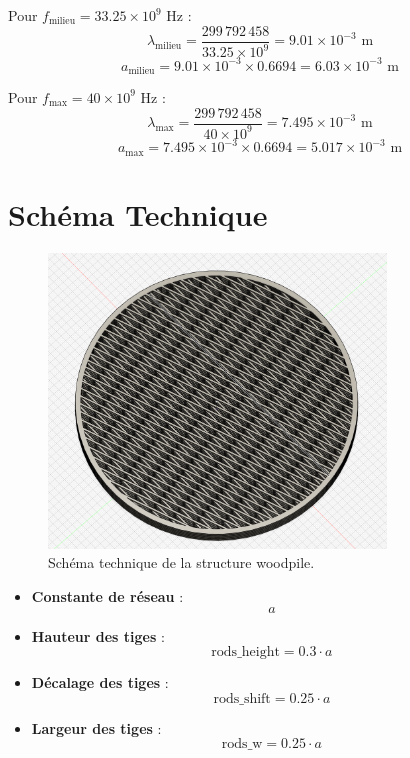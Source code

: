 \documentclass{article}
\begin{document}
Pour \( f_{\text{milieu}} = 33.25 \times 10^9 \) Hz :
\[
\lambda_{\text{milieu}} = \frac{299\,792\,458}{33.25 \times 10^9} = 9.01 \times 10^{-3} \text{ m}
\]
\[
a_{\text{milieu}} = 9.01 \times 10^{-3} \times 0.6694 = 6.03 \times 10^{-3} \text{ m}
\]

Pour \( f_{\text{max}} = 40 \times 10^9 \) Hz :
\[
\lambda_{\text{max}} = \frac{299\,792\,458}{40 \times 10^9} = 7.495 \times 10^{-3} \text{ m}
\]
\[
a_{\text{max}} = 7.495 \times 10^{-3} \times 0.6694 = 5.017 \times 10^{-3} \text{ m}
\]
\section{Schéma Technique}
\begin{figure}[h!]
    \centering
    \includegraphics[width=0.8\textwidth]{Images/CaM9WdelYQNDJb8v.png}
    \caption{Schéma technique de la structure woodpile.}
    \label{fig:schema}
\end{figure}

\begin{itemize}
    \item \textbf{Constante de réseau} :  
    \[
    a
    \]
    \item \textbf{Hauteur des tiges} :  
    \[
    \text{rods\_height} = 0.3 \cdot a
    \]
    \item \textbf{Décalage des tiges} :  
    \[
    \text{rods\_shift} = 0.25 \cdot a
    \]
    \item \textbf{Largeur des tiges} :  
    \[
    \text{rods\_w} = 0.25 \cdot a
    \]
    
\end{itemize}
\end{document}
